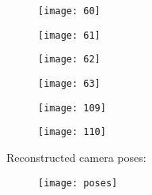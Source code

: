 \newpage

\begin{figure}[h]
\centering
\begin{minipage}{0.45\textwidth}
\texttt{[image: 60]}
\end{minipage}
\begin{minipage}{0.45\textwidth}
\texttt{[image: 61]}
\end{minipage}
\end{figure}

\begin{figure}[H]
\centering
\begin{minipage}{0.45\textwidth}
\texttt{[image: 62]}
\end{minipage}
\begin{minipage}{0.45\textwidth}
\texttt{[image: 63]}
\end{minipage}
\end{figure}

\newpage

\begin{figure}[h]
\centering
\begin{minipage}{0.45\textwidth}
\texttt{[image: 109]}
\end{minipage}
\begin{minipage}{0.45\textwidth}
\texttt{[image: 110]}
\end{minipage}
\end{figure}

\newpage

Reconstructed camera poses:

\begin{figure}[h]
\centering
\texttt{[image: poses]}
\end{figure}